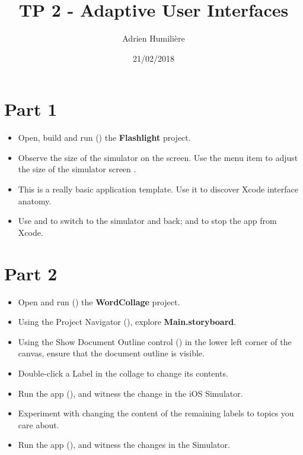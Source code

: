 \documentclass[a4paper,11pt]{scrartcl}
\begin{document}
\newcommand{\mytitle}{TP 2 - Adaptive User Interfaces}
\title{\mytitle}
\author{Adrien Humilière}
\date{21/02/2018}

\maketitle

\section*{Part 1}

\begin{itemize}
\item Open, build and run () the \textbf{Flashlight} project.
\item Observe the size of the simulator on the screen. Use the menu item  to adjust the size of the simulator screen       .
\item This is a really basic application template. Use it to discover Xcode interface anatomy.
\item Use \keys{\cmd+\tab} and  to switch to the simulator and back; and to stop the app from Xcode.
\end{itemize}

\section*{Part 2}

\begin{itemize}
\item Open and run () the \textbf{WordCollage} project.
\item Using the Project Navigator (), explore \textbf{Main.storyboard}.
\item Using the Show Document Outline control () in the lower left corner of the canvas, ensure that the document outline is visible.
\item Double-click a Label in the collage to change its contents.
\item Run the app (), and witness the change in the iOS Simulator.
\item Experiment with changing the content of the remaining labels to topics you care about.
\item Run the app (), and witness the changes in the Simulator.
\end{itemize}
\end{document}
